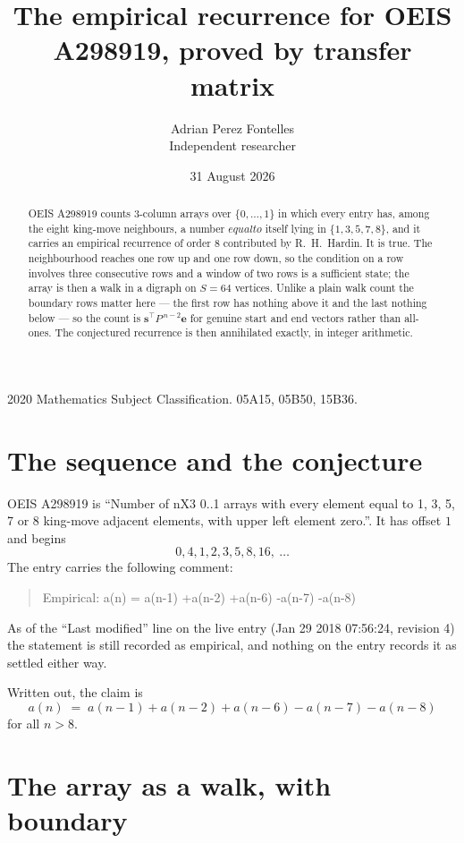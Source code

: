 \documentclass[11pt,a4paper]{article}
\title{The empirical recurrence for OEIS A298919, proved by transfer matrix}
\author{Adrian Perez Fontelles\\ \small Independent researcher}
\date{31 August 2026}
\theoremstyle{plain}
\theoremstyle{definition}
\begin{document}
\maketitle

\begin{abstract}
OEIS A298919 counts $3$-column arrays over $\{0,\dots,1\}$ in which every entry has,
among the eight king-move neighbours, a number $equal to$ itself lying in $\{1,3,5,7,8\}$, and it carries an empirical
recurrence of order $8$ contributed by R.~H.~Hardin. It is true. The neighbourhood
reaches one row up and one row down, so the condition on a row involves three consecutive
rows and a window of two rows is a sufficient state; the array is then a walk in a digraph
on $S=64$ vertices. Unlike a plain walk count the boundary rows matter here --- the first
row has nothing above it and the last nothing below --- so the count is
$\mathbf{s}^{\!\top}P^{\,n-2}\mathbf{e}$ for genuine start and end vectors rather than
all-ones. The conjectured recurrence is then annihilated exactly, in integer arithmetic.
\end{abstract}

\noindent\small 2020 Mathematics Subject Classification. 05A15, 05B50, 15B36.\normalsize

\section{The sequence and the conjecture}

OEIS A298919 is ``Number of nX3 0..1 arrays with every element equal to 1, 3, 5, 7 or 8 king-move adjacent elements, with upper left element zero.''. It has offset
$1$ and begins
\[
0, 4, 1, 2, 3, 5, 8, 16,\ \dots
\]
The entry carries the following comment:
\begin{quote}\small
Empirical: a(n) = a(n-1) +a(n-2) +a(n-6) -a(n-7) -a(n-8)
\end{quote}
As of the ``Last modified'' line on the live entry (Jan 29 2018 07:56:24, revision
4) the statement is still recorded as empirical, and nothing on the entry
records it as settled either way.

Written out, the claim is
\begin{equation}\label{eq:conj}
a(n)\;=\;a(n-1) + a(n-2) + a(n-6) - a(n-7) - a(n-8)
\end{equation}
for all $n>8$.

\section{The array as a walk, with boundary}
\end{document}
